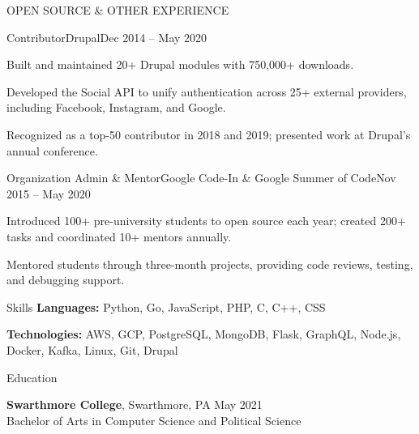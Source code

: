 \documentclass{resume} %
\begin{document}
\begin{rSection}{OPEN SOURCE \& OTHER EXPERIENCE}

\begin{rSubsection}{Contributor}{Drupal}{}{Dec 2014 -- May 2020}
\item Built and maintained 20+ Drupal modules with 750,000+ downloads.
\item Developed the Social API to unify authentication across 25+ external providers, including Facebook, Instagram, and Google.
\item Recognized as a top-50 contributor in 2018 and 2019; presented work at Drupal's annual conference.
\end{rSubsection}


\begin{rSubsection}{Organization Admin \& Mentor}{Google Code-In \& Google Summer of Code}{}{Nov 2015 -- May 2020}
\item Introduced 100+ pre-university students to open source each year; created 200+ tasks and coordinated 10+ mentors annually.
\item Mentored students through three-month projects, providing code reviews, testing, and debugging support.
\end{rSubsection}


\end{rSection}


\begin{rSection}{Skills}
	\textbf{Languages:} Python, Go, JavaScript, PHP, C, C++, CSS
	
	\textbf{Technologies:} AWS, GCP, PostgreSQL, MongoDB, Flask, GraphQL, Node.js, Docker, Kafka, Linux, Git, Drupal
\end{rSection}


\begin{rSection}{Education}
	
	{\bf Swarthmore College}, Swarthmore, PA \hfill {May 2021} \\ 
	Bachelor of Arts in Computer Science and Political Science
	
\end{rSection}
\end{document}
